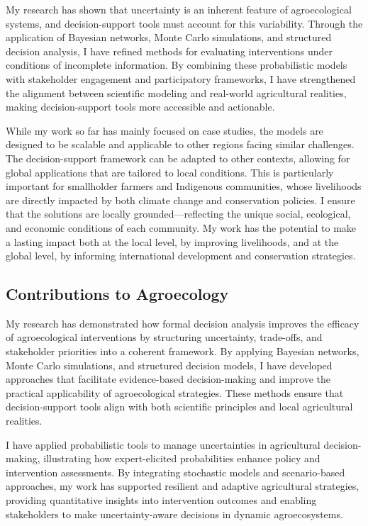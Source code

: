 \documentclass[
]{article}
\begin{document}
My research has shown that uncertainty is an inherent feature of
agroecological systems, and decision-support tools must account for this
variability. Through the application of Bayesian networks, Monte Carlo
simulations, and structured decision analysis, I have refined methods
for evaluating interventions under conditions of incomplete information.
By combining these probabilistic models with stakeholder engagement and
participatory frameworks, I have strengthened the alignment between
scientific modeling and real-world agricultural realities, making
decision-support tools more accessible and actionable.

While my work so far has mainly focused on case studies, the models are
designed to be scalable and applicable to other regions facing similar
challenges. The decision-support framework can be adapted to other
contexts, allowing for global applications that are tailored to local
conditions. This is particularly important for smallholder farmers and
Indigenous communities, whose livelihoods are directly impacted by both
climate change and conservation policies. I ensure that the solutions
are locally grounded---reflecting the unique social, ecological, and
economic conditions of each community. My work has the potential to make
a lasting impact both at the local level, by improving livelihoods, and
at the global level, by informing international development and
conservation strategies.

\hypertarget{contributions-to-agroecology}{%
\subsection{Contributions to
Agroecology}\label{contributions-to-agroecology}}

My research has demonstrated how formal decision analysis improves the
efficacy of agroecological interventions by structuring uncertainty,
trade-offs, and stakeholder priorities into a coherent framework. By
applying Bayesian networks, Monte Carlo simulations, and structured
decision models, I have developed approaches that facilitate
evidence-based decision-making and improve the practical applicability
of agroecological strategies. These methods ensure that decision-support
tools align with both scientific principles and local agricultural
realities.

I have applied probabilistic tools to manage uncertainties in
agricultural decision-making, illustrating how expert-elicited
probabilities enhance policy and intervention assessments. By
integrating stochastic models and scenario-based approaches, my work has
supported resilient and adaptive agricultural strategies, providing
quantitative insights into intervention outcomes and enabling
stakeholders to make uncertainty-aware decisions in dynamic
agroecosystems.
\end{document}
